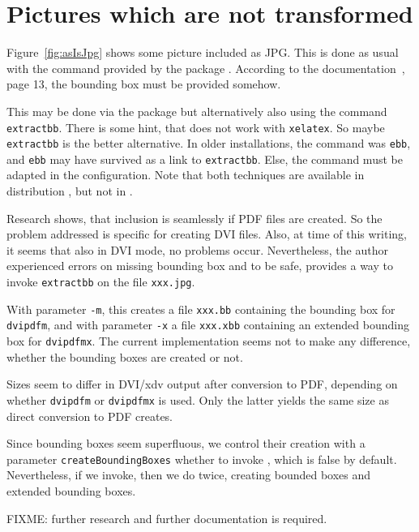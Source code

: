 \section{Pictures which are not transformed}\label{sec:picAsIs}

Figure~\ref{fig:asIsJpg} shows some picture included as JPG\@. 
This is done as usual with the command 
provided by the package . 
According to the documentation~\cite{GraX}, page 13, 
the bounding box must be provided somehow. 

This may be done via the package  
but alternatively also using the command \texttt{extractbb}. 
There is some hint, that  does not work with \texttt{xelatex}. 
So maybe \texttt{extractbb} is the better alternative. 
In older installations, the command was \texttt{ebb}, 
and \texttt{ebb} may have survived as a link to \texttt{extractbb}. 
Else, the command must be adapted in the configuration. 
Note that both techniques are available in distribution \texlive, 
but not in \miktex. 

Research shows, that inclusion is seamlessly if PDF files are created. 
So the problem addressed is specific for creating DVI files. 
Also, at time of this writing, it seems that also in DVI mode, no problems occur. 
Nevertheless, the author experienced errors on missing bounding box 
and to be safe, provides a way to invoke \texttt{extractbb} on the file \texttt{xxx.jpg}. 

With parameter \texttt{-m}, this creates a file \texttt{xxx.bb} 
containing the bounding box for \texttt{dvipdfm}, 
and with parameter \texttt{-x} a file \texttt{xxx.xbb} 
containing an extended bounding box for \texttt{dvipdfmx}. 
The current implementation seems not to make any difference, 
whether the bounding boxes are created or not. 

Sizes seem to differ in DVI/\gls{xdv} output after conversion to PDF, 
depending on whether \texttt{dvipdfm} or \texttt{dvipdfmx} is used. 
Only the latter yields the same size as direct conversion to PDF creates. 

Since bounding boxes seem superfluous, 
we control their creation with a parameter \texttt{createBoundingBoxes} 
whether to invoke , which is false by default. 
Nevertheless, if we invoke, then we do twice, 
creating bounded boxes and extended bounding boxes. 


FIXME\@: further research and further documentation is required. 

